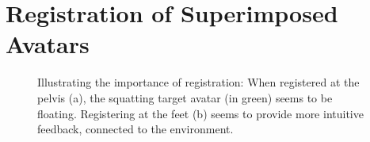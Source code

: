 
\chapter{Registration of Superimposed Avatars \label{chap:registration}}
\begin{figure}[ht]
	\centering
	\caption[Illustrating the importance of registration.]{Illustrating the importance of registration: When registered at the pelvis (a), the squatting target avatar (in green) seems to be floating. Registering at the feet (b) seems to provide more intuitive feedback, connected to the environment.}
	\label{fig:registrationComparison}
\end{figure}

